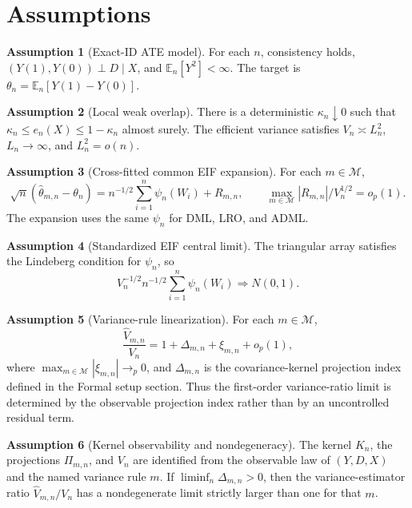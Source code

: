 \documentclass[11pt]{article}
\newcommand{\E}{\mathbb{E}}
\theoremstyle{definition}
\newtheorem{assumption}{Assumption}
\theoremstyle{plain}
\theoremstyle{remark}
\begin{document}
\section{Assumptions}
\begin{assumption}[Exact-ID ATE model]\label{ass:exact-ate}
For each \(n\), consistency holds, \((Y(1),Y(0))\perp D\mid X\), and \(\E_n[Y^2]<\infty\).  The target is \(\theta_n=\E_n[Y(1)-Y(0)]\).
\end{assumption}

\begin{assumption}[Local weak overlap]\label{ass:local-overlap}
There is a deterministic \(\kappa_n\downarrow0\) such that \(\kappa_n\le e_n(X)\le1-\kappa_n\) almost surely.  The efficient variance satisfies \(V_n\asymp L_n^2\), \(L_n\to\infty\), and \(L_n^2=o(n)\).
\end{assumption}

\begin{assumption}[Cross-fitted common EIF expansion]\label{ass:common-eif}
For each \(m\in\mathcal M\),
\[
  \sqrt n(\hat\theta_{m,n}-\theta_n)
  =
  n^{-1/2}\sum_{i=1}^n \psi_n(W_i)+R_{m,n},
  \qquad
  \max_{m\in\mathcal M}|R_{m,n}|/V_n^{1/2}=o_p(1).
\]
The expansion uses the same \(\psi_n\) for DML, LRO, and ADML.
\end{assumption}

\begin{assumption}[Standardized EIF central limit]\label{ass:eif-clt}
The triangular array satisfies the Lindeberg condition for \(\psi_n\), so
\[
  V_n^{-1/2}n^{-1/2}\sum_{i=1}^n\psi_n(W_i)\Rightarrow N(0,1).
\]
\end{assumption}

\begin{assumption}[Variance-rule linearization]\label{ass:variance-linear}
For each \(m\in\mathcal M\),
\[
  \frac{\hat V_{m,n}}{V_n}
  =
  1+\Delta_{m,n}+\xi_{m,n}+o_p(1),
\]
where \(\max_{m\in\mathcal M}|\xi_{m,n}|\to_p0\), and \(\Delta_{m,n}\) is the covariance-kernel projection index defined in the Formal setup section.  Thus the first-order variance-ratio limit is determined by the observable projection index rather than by an uncontrolled residual term.
\end{assumption}

\begin{assumption}[Kernel observability and nondegeneracy]\label{ass:kernel-observable}
The kernel \(K_n\), the projections \(\Pi_{m,n}\), and \(V_n\) are identified from the observable law of \((Y,D,X)\) and the named variance rule \(m\).  If \(\liminf_n\Delta_{m,n}>0\), then the variance-estimator ratio \(\hat V_{m,n}/V_n\) has a nondegenerate limit strictly larger than one for that \(m\).
\end{assumption}
\end{document}
